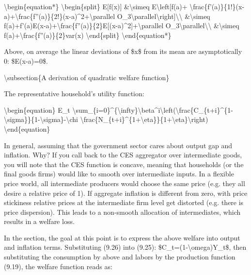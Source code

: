 \documentclass[10pt,math=newtx,citestyle=gb7714-2015,bibstyle=gb7714-2015]{elegantbook}
\begin{document}
	\textbackslash{}begin\{equation*\}
	\textbackslash{}begin\{split\}
	E[f(x)] \&\textbackslash{}simeq E\textbackslash{}left[f(a)+ \textbackslash{}frac\{f'(a)\}\{1!\}(x-a)+\textbackslash{}frac\{f''(a)\}\{2!\}(x-a)\^{}2+\textbackslash{}parallel O\_3\textbackslash{}parallel\textbackslash{}right]\textbackslash{}\textbackslash{}
	\&\textbackslash{}simeq f(a)+f'(a)E(x-a)+\textbackslash{}frac\{f''(a)\}\{2\}E[(x-a)\^{}2]+\textbackslash{}parallel O\_3\textbackslash{}parallel\textbackslash{}\textbackslash{}
	\&\textbackslash{}simeq f(a)+\textbackslash{}frac\{f''(a)\}\{2\}var(x)
	\textbackslash{}end\{split\}
	\textbackslash{}end\{equation*\}
	
	Above, on average the linear deviations of \$x\$ from its mean are asymptotically 0: \$E(x-a)=0\$.
	
	\textbackslash{}subsection\{A derivation of quadratic welfare function\}
	
	The representative household's utility function:
	
	\textbackslash{}begin\{equation\}
	E\_t \textbackslash{}sum\_\{i=0\}\^{}\{\textbackslash{}infty\}\textbackslash{}beta\^{}i\textbackslash{}left(\textbackslash{}frac\{C\_\{t+i\}\^{}\{1-\textbackslash{}sigma\}\}\{1-\textbackslash{}sigma\}-\textbackslash{}chi \textbackslash{}frac\{N\_\{t+i\}\^{}\{1+\textbackslash{}eta\}\}\{1+\textbackslash{}eta\}\textbackslash{}right)
	\textbackslash{}end\{equation\}
	
	In general, assuming that the government sector cares about output gap and inflation. Why? If you call back to the CES aggregator over intermediate goods, you will note that the CES function is concave, meaning that households (or the final goods firms) would like to smooth over intermediate inputs. In a flexible price world, all intermediate producers would choose the same price (e.g. they all desire a relative price of 1). If aggregate inflation is different from zero, with price stickiness relative prices at the intermediate firm level get distorted (e.g. there is price dispersion). This leads to a non-smooth allocation of intermediates, which results in a welfare loss.
	
	In the section, the goal at this point is to express the above welfare into output and inflation terms. Substituting (9.26) into (9.25): \$C\_t=(1-\textbackslash{}omega)Y\_t\$, then substituting the consumption by above and labors by the production function (9.19), the welfare function reads as:
	
\end{document}
